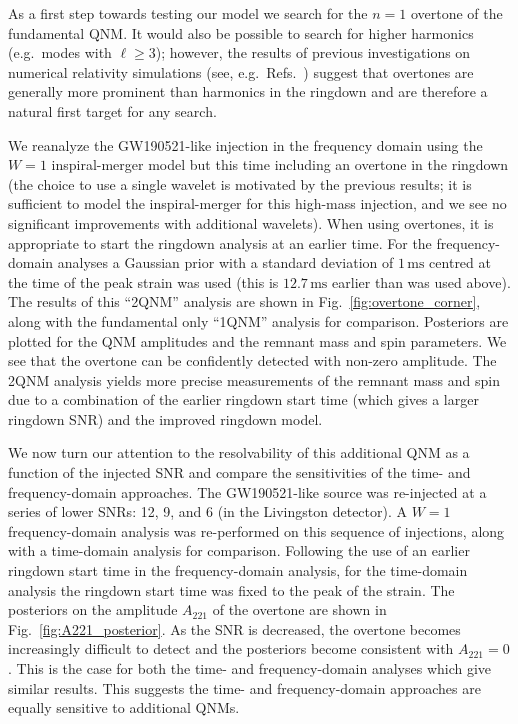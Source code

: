 As a first step towards testing our model we search for the $n=1$ overtone of the fundamental QNM.
It would also be possible to search for higher harmonics (e.g.\ modes with $\ell\geq 3$); however, the results of previous investigations on numerical relativity simulations (see, e.g.\ Refs.~\cite{Giesler:2019uxc, Ota:2019bzl, Dhani:2020nik, Finch:2021iip}) suggest that overtones are generally more prominent than harmonics in the ringdown and are therefore a natural first target for any search.

We reanalyze the GW190521-like injection in the frequency domain using the $W=1$ inspiral-merger model but this time including an overtone in the ringdown (the choice to use a single wavelet is motivated by the previous results; it is sufficient to model the inspiral-merger for this high-mass injection, and we see no significant improvements with additional wavelets).
When using overtones, it is appropriate to start the ringdown analysis at an earlier time. 
For the frequency-domain analyses a Gaussian prior with a standard deviation of $1\,\mathrm{ms}$ centred at the time of the peak strain was used (this is $12.7\,\mathrm{ms}$ earlier than was used above).
The results of this ``2QNM'' analysis are shown in Fig.~\ref{fig:overtone_corner}, along with the fundamental only ``1QNM'' analysis for comparison.
Posteriors are plotted for the QNM amplitudes and the remnant mass and spin parameters. 
We see that the overtone can be confidently detected with non-zero amplitude.
The 2QNM analysis yields more precise measurements of the remnant mass and spin due to a combination of the earlier ringdown start time (which gives a larger ringdown SNR) and the improved ringdown model.

We now turn our attention to the resolvability of this additional QNM as a function of the injected SNR and compare the sensitivities of the time- and frequency-domain approaches.
The GW190521-like source was re-injected at a series of lower SNRs: 12, 9, and 6 (in the Livingston detector).
A $W=1$ frequency-domain analysis was re-performed on this sequence of injections, along with a time-domain analysis for comparison. 
Following the use of an earlier ringdown start time in the frequency-domain analysis, for the time-domain analysis the ringdown start time was fixed to the peak of the strain.
The posteriors on the amplitude $A_{221}$ of the overtone are shown in Fig.~\ref{fig:A221_posterior}.
As the SNR is decreased, the overtone becomes increasingly difficult to detect and the posteriors become consistent with $A_{221}=0$.
This is the case for both the time- and frequency-domain analyses which give similar results.
This suggests the time- and frequency-domain approaches are equally sensitive to additional QNMs.

